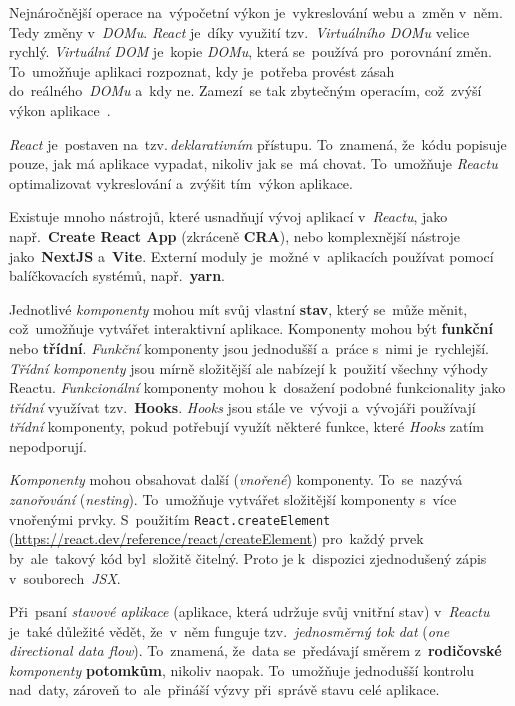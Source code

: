 \documentclass[11pt,a4paper]{report}
\begin{document}
            Nejnáročnější operace na~výpočetní výkon je~vykreslování webu a~změn v~něm. Tedy změny v~\emph{DOMu}. \emph{React} je~díky využití tzv.~\emph{Virtuálního DOMu} velice rychlý. \emph{Virtuální DOM} je~kopie \emph{DOMu}, která se~používá pro~porovnání změn. To~umožňuje aplikaci rozpoznat, kdy je~potřeba provést zásah do~reálného~\emph{DOMu} a~kdy ne. Zamezí~se tak zbytečným operacím, což~zvýší výkon aplikace~\cite{elrom2021react}.
            
            \emph{React} je~postaven na~tzv.\,\emph{deklarativním} přístupu. To~znamená, že~kódu popisuje pouze, jak má aplikace vypadat, nikoliv jak se~má chovat. To~umožňuje \emph{Reactu} optimalizovat vykreslování a~zvýšit tím~výkon aplikace.
            
            Existuje mnoho nástrojů, které usnadňují vývoj aplikací v~\emph{Reactu}, jako např.~\textbf{Create React App} (zkráceně \textbf{CRA}), nebo komplexnější nástroje jako~\textbf{NextJS} a~\textbf{Vite}. Externí moduly je~možné v~aplikacích používat pomocí balíčkovacích systémů, např.~\textbf{yarn}.

            Jednotlivé \emph{komponenty} mohou mít svůj vlastní \textbf{stav}, který se~může měnit, což~umožňuje vytvářet interaktivní aplikace. Komponenty mohou být \textbf{funkční} nebo \textbf{třídní}. \emph{Funkční} komponenty jsou jednodušší a~práce s~nimi je~rychlejší. \emph{Třídní komponenty} jsou mírně složitější ale nabízejí k~použití všechny výhody Reactu. \emph{Funkcionální} komponenty mohou k~dosažení podobné funkcionality jako \emph{třídní} využívat tzv.~\textbf{Hooks}. \emph{Hooks} jsou stále ve~vývoji a~vývojáři používají \emph{třídní} komponenty, pokud potřebují využít některé funkce, které \emph{Hooks} zatím nepodporují.

            \emph{Komponenty} mohou obsahovat další (\emph{vnořené}) komponenty. To~se~nazývá \emph{zanořování} (\emph{nesting}). To~umožňuje vytvářet složitější komponenty s~více vnořenými prvky. S~použitím \texttt{React.createElement} (\url{https://react.dev/reference/react/createElement}) pro~každý prvek by~ale~takový kód byl~složitě čitelný. Proto je k~dispozici zjednodušený zápis v~souborech~\emph{JSX}.

            Při~psaní \emph{stavové aplikace} (aplikace, která udržuje svůj vnitřní stav) v~\emph{Reactu} je~také důležité vědět, že~v~něm funguje tzv.~\emph{jednosměrný tok dat} (\emph{one directional data flow}). To~znamená, že~data se~předávají směrem z~\textbf{rodičovské} \emph{komponenty} \textbf{potomkům}, nikoliv naopak. To~umožňuje jednodušší kontrolu nad~daty, zároveň to~ale~přináší výzvy při~správě stavu celé aplikace.
            
\end{document}
